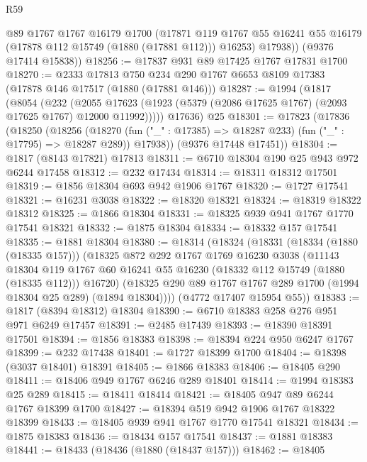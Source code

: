 \begin{lexlean}{R59}
\begin{coremodule}
          @89
          @1767
          @1767
          @16179
          @1700
          (@17871
            @119
            @1767
            @55
            @16241
            @55
            @16179
            (@17878 @112 @15749 (@1880 (@17881 @112)))
            @16253)
          @17938))
      (@9376 @17414 @15838))
@18256 := @17837 @931 @89 @17425 @1767 @17831 @1700
@18270 := @2333
    @17813
    @750
    @234
    @290
    @1767
    @6653
    @8109
    @17383
    (@17878 @146 @17517 (@1880 (@17881 @146)))
@18287 := @1994
    (@1817
      (@8054
        (@232
          (@2055 @17623 (@1923 (@5379 (@2086 @17625 @1767) (@2093 @17625 @1767) @12000 @11992)))))
      @17636)
    @25
@18301 := @17823
    (@17836
      (@18250
        (@18256
          (@18270 (fun ("_" : @17385) => @18287 @233) (fun ("_" : @17795) => @18287 @289))
          @17938))
      (@9376 @17448 @17451))
@18304 := @1817 (@8143 @17821) @17813
@18311 := @6710 @18304 @190 @25 @943 @972 @6244 @17458
@18312 := @232 @17434
@18314 := @18311 @18312 @17501
@18319 := @1856 @18304 @693 @942 @1906 @1767
@18320 := @1727 @17541
@18321 := @16231 @3038
@18322 := @18320 @18321
@18324 := @18319 @18322 @18312
@18325 := @1866 @18304
@18331 := @18325 @939 @941 @1767 @1770 @17541 @18321
@18332 := @1875 @18304
@18334 := @18332 @157 @17541
@18335 := @1881 @18304
@18380 := @18314
    (@18324
      (@18331
        (@18334 (@1880 (@18335 @157)))
        (@18325
          @872
          @292
          @1767
          @1769
          @16230
          @3038
          (@11143
            @18304
            @119
            @1767
            @60
            @16241
            @55
            @16230
            (@18332 @112 @15749 (@1880 (@18335 @112)))
            @16720)
          (@18325 @290 @89 @1767 @1767 @289 @1700 (@1994 @18304 @25 @289) (@1894 @18304))))
      (@4772 @17407 @15954 @55))
@18383 := @1817 (@8394 @18312) @18304
@18390 := @6710 @18383 @258 @276 @951 @971 @6249 @17457
@18391 := @2485 @17439
@18393 := @18390 @18391 @17501
@18394 := @1856 @18383
@18398 := @18394 @224 @950 @6247 @1767
@18399 := @232 @17438
@18401 := @1727 @18399 @1700
@18404 := @18398 (@3037 @18401) @18391
@18405 := @1866 @18383
@18406 := @18405 @290
@18411 := @18406 @949 @1767 @6246 @289 @18401
@18414 := @1994 @18383 @25 @289
@18415 := @18411 @18414
@18421 := @18405 @947 @89 @6244 @1767 @18399 @1700
@18427 := @18394 @519 @942 @1906 @1767 @18322 @18399
@18433 := @18405 @939 @941 @1767 @1770 @17541 @18321
@18434 := @1875 @18383
@18436 := @18434 @157 @17541
@18437 := @1881 @18383
@18441 := @18433 (@18436 (@1880 (@18437 @157)))
@18462 := @18405

\end{coremodule}
\end{lexlean}
